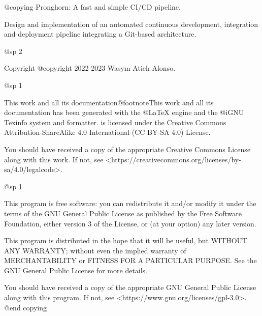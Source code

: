 @copying
Pronghorn: A fast and simple CI/CD pipeline.

Design and implementation of an automated continuous development, integration and deployment pipeline integrating a Git-based architecture.

@sp 2

Copyright @copyright{} 2022-2023 Wasym Atieh Alonso.

@sp 1

This work and all its documentation@footnote{This work and all its documentation has been generated with the @LaTeX{} engine and the @i{GNU Texinfo} system and formatter.} is licensed under the Creative Commons Attribution-ShareAlike 4.0 International (CC BY-SA 4.0) License.

You should have received a copy of the appropriate Creative Commons License along with this work. If not, see <https://creativecommons.org/licenses/by-sa/4.0/legalcode>.

@sp 1

This program is free software: you can redistribute it and/or modify it under the terms of the GNU General Public License as published by the Free Software Foundation, either version 3 of the License, or (at your option) any later version.

This program is distributed in the hope that it will be useful, but WITHOUT ANY WARRANTY; without even the implied warranty of MERCHANTABILITY or FITNESS FOR A PARTICULAR PURPOSE. See the GNU General Public License for more details.

You should have received a copy of the appropriate GNU General Public License along with this program. If not, see <https://www.gnu.org/licenses/gpl-3.0>.
@end copying
